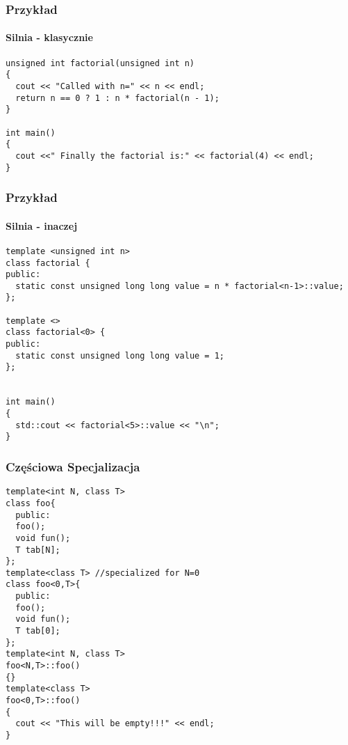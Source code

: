 \documentclass[10pt]{beamer}
\begin{document}
\begin{frame}[fragile]
  \frametitle{Przykład}
  \framesubtitle{Silnia - klasycznie}
\begin{lstlisting}
unsigned int factorial(unsigned int n)
{
  cout << "Called with n=" << n << endl;
  return n == 0 ? 1 : n * factorial(n - 1); 
}

int main()
{
  cout <<" Finally the factorial is:" << factorial(4) << endl;  
}
\end{lstlisting}
\end{frame}

\begin{frame}[fragile]
  \frametitle{Przykład}
  \framesubtitle{Silnia - inaczej}
\begin{lstlisting}
template <unsigned int n>
class factorial {
public:
  static const unsigned long long value = n * factorial<n-1>::value;
};

template <>
class factorial<0> {
public:
  static const unsigned long long value = 1;
};


int main()
{
  std::cout << factorial<5>::value << "\n";
}
\end{lstlisting}
\end{frame}

\begin{frame}[fragile]
  \frametitle{Częściowa Specjalizacja}

\begin{lstlisting}
template<int N, class T>
class foo{
  public:
  foo();
  void fun();
  T tab[N];
};
template<class T> //specialized for N=0
class foo<0,T>{
  public:
  foo();
  void fun();
  T tab[0];
};
template<int N, class T>
foo<N,T>::foo()
{}
template<class T>
foo<0,T>::foo()
{
  cout << "This will be empty!!!" << endl;
}
\end{lstlisting}
\end{frame}
\end{document}
